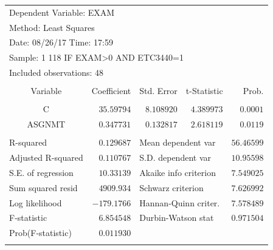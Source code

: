\documentclass[12pt]{report}
\begin{document}
\begin{table}[H]
	\centering
	\begin{tabular}{lrrrr}
		\multicolumn{3}{l}{Dependent Variable: EXAM}&\multicolumn{1}{c}{}&\multicolumn{1}{c}{}\\
		\multicolumn{3}{l}{Method: Least Squares}&\multicolumn{1}{c}{}&\multicolumn{1}{c}{}\\
		\multicolumn{3}{l}{Date: 08/26/17   Time: 17:59}&\multicolumn{1}{c}{}&\multicolumn{1}{c}{}\\
		\multicolumn{4}{l}{Sample: 1 118 IF EXAM\textgreater 0 AND ETC3440=1}&\multicolumn{1}{c}{}\\
		\multicolumn{3}{l}{Included observations: 48}&\multicolumn{1}{c}{}&\multicolumn{1}{c}{}\\
		[4.5pt] \hline \\ [-4.5pt]
		\multicolumn{1}{c}{Variable}&\multicolumn{1}{r}{Coefficient}&\multicolumn{1}{r}{Std. Error}&\multicolumn{1}{r}{t-Statistic}&\multicolumn{1}{r}{Prob.}\\
		[4.5pt] \hline \\ [-4.5pt]
		\multicolumn{1}{c}{C}&\multicolumn{1}{r}{$35.59794$}&\multicolumn{1}{r}{$8.108920$}&\multicolumn{1}{r}{$4.389973$}&\multicolumn{1}{r}{$0.0001$}\\
		\multicolumn{1}{c}{ASGNMT}&\multicolumn{1}{r}{$0.347731$}&\multicolumn{1}{r}{$0.132817$}&\multicolumn{1}{r}{$2.618119$}&\multicolumn{1}{r}{$0.0119$}\\
		[4.5pt] \hline \\ [-4.5pt]
		\multicolumn{1}{l}{R-squared}&\multicolumn{1}{r}{$0.129687$}&\multicolumn{2}{l}{Mean dependent var}&\multicolumn{1}{r}{$56.46599$}\\
		\multicolumn{1}{l}{Adjusted R-squared}&\multicolumn{1}{r}{$0.110767$}&\multicolumn{2}{l}{S.D. dependent var}&\multicolumn{1}{r}{$10.95598$}\\
		\multicolumn{1}{l}{S.E. of regression}&\multicolumn{1}{r}{$10.33139$}&\multicolumn{2}{l}{Akaike info criterion}&\multicolumn{1}{r}{$7.549025$}\\
		\multicolumn{1}{l}{Sum squared resid}&\multicolumn{1}{r}{$4909.934$}&\multicolumn{2}{l}{Schwarz criterion}&\multicolumn{1}{r}{$7.626992$}\\
		\multicolumn{1}{l}{Log likelihood}&\multicolumn{1}{r}{$-179.1766$}&\multicolumn{2}{l}{Hannan-Quinn criter.}&\multicolumn{1}{r}{$7.578489$}\\
		\multicolumn{1}{l}{F-statistic}&\multicolumn{1}{r}{$6.854548$}&\multicolumn{2}{l}{Durbin-Watson stat}&\multicolumn{1}{r}{$0.971504$}\\
		\multicolumn{1}{l}{Prob(F-statistic)}&\multicolumn{1}{r}{$0.011930$}&\multicolumn{1}{c}{}&\multicolumn{1}{c}{}&\multicolumn{1}{c}{}\\
		[4.5pt] \hline \\ [-4.5pt]
	\end{tabular}
\end{table}
\end{document}
